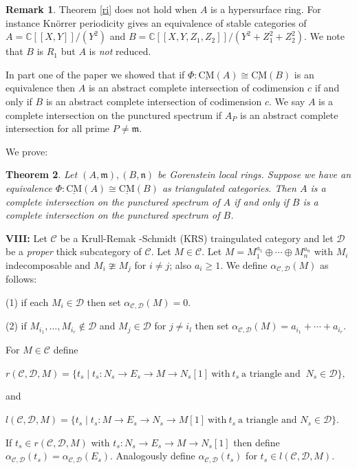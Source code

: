 \documentclass{amsart}
\newcommand{\D}{\mathcal{D} }
\newcommand{\n}{\mathfrak{n} }
\newcommand{\m}{\mathfrak{m} }
\newcommand{\C}{\mathcal{C}}
\newcommand{\rt}{\rightarrow}
\newcommand{\CMS}{\operatorname{\underline{CM}}}
\theoremstyle{plain}
\newtheorem{theorem}{Theorem}[section]
\theoremstyle{definition}
\newtheorem{remark}[theorem]{Remark}
\theoremstyle{remark}
\begin{document}
{\begin{remark}
Theorem \ref{ri} does not hold when $A$ is a hypersurface ring. For instance Kn\"orrer periodicity gives an equivalence of stable categories of \\ $A = \mathbb{C}[[X, Y]]/(Y^2)$ and
$B = \mathbb{C}[[X, Y, Z_1, Z_2]]/(Y^2 + Z_1^2 + Z_2^2)$. We note that $B$ is $R_1$ but $A$ is \emph{not} reduced.
\end{remark}
In part one of the paper we showed that if $\Phi \colon \CMS(A) \cong \CMS(B)$ is an equivalence then $A$ is an abstract complete intersection of codimension $c$ if and only if $B$ is an abstract complete intersection of codimension $c$. We say $A$ is a complete intersection on the punctured spectrum if $A_P$ is an abstract complete intersection for all prime $P \neq \m$.

We prove:
\begin{theorem}
\label{ci}
Let $(A,\m), (B,\n) $ be  Gorenstein local rings. Suppose we have an equivalence $\Phi \colon \CMS(A) \cong \CMS(B)$ as triangulated categories. Then $A$  is a complete intersection on the punctured spectrum of $A$ if and only if $B$ is a complete intersection on the punctured spectrum of $B$.
\end{theorem}

\textbf{VIII:} Let $\C$ be a Krull-Remak -Schmidt (KRS) traingulated category and let $\D$ be a \emph{proper} thick subcategory of $\C$. Let $M \in \C$. Let $M = M_1^{a_1}\oplus \cdots \oplus M_n^{a_n}$ with $M_i$ indecomposable and $M_ i \ncong M_j$ for $i\neq j$; also $a_i \geq 1$. We define $\alpha_{\C, \D}(M)$ as follows:

(1) if each $M_i \in \D$ then set $\alpha_{\C, \D}(M) = 0$.

(2) if $M_{i_1}, \ldots, M_{i_r} \notin \D$ and $M_j \in \D$ for $j \neq i_l$ then set $\alpha_{\C, \D}(M) = a_{i_1} + \cdots + a_{i_r}.$

For $M \in \C$ define

$r(\C, \D, M) =  \{  t_s \mid t_s \colon N_s \rt E_s \rt M \rt N_s[1] \ \text{with} \ t_s  \ \text{a triangle and } \ N_s \in \D  \},$

and

$l(\C, \D, M) = \{ t_s \mid t_s \colon M \rt E_s \rt N_s \rt M[1] \ \text{with} \ t_s  \ \text{a triangle and }  N_s \in \D  \}.$

If $t_s \in r(\C, \D, M)$ with $t_s \colon N_s \rt E_s \rt M \rt N_s[1]$ then define \\ $\alpha_{\C, \D}(t_s) = \alpha_{\C, \D}(E_s)$. Analogously define $\alpha_{\C, \D}(t_s)$ for $t_s \in l(\C, \D, M)$.

}
\end{document}
